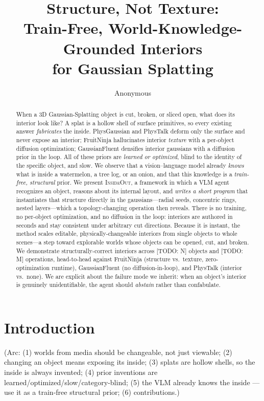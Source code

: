 \documentclass[10pt,twocolumn,letterpaper]{article}
\title{\vspace{-1em}\bfseries Structure, Not Texture:\\
Train-Free, World-Knowledge-Grounded Interiors\\ for Gaussian Splatting}
\author{Anonymous \and \todo{author list}}
\date{}
\newcommand{\sysname}{\textsc{InsideOut}} %
\newcommand{\todo}[1]{{\color{red}\small[TODO: #1]}}
\newcommand{\note}[1]{{\color{teal}\small(#1)}}
\begin{document}
\maketitle

\begin{abstract}
When a 3D Gaussian-Splatting object is cut, broken, or sliced open, what
does its interior look like? A splat is a hollow shell of surface
primitives, so every existing answer \emph{fabricates} the inside.
PhysGaussian and PhysTalk deform only the surface and never expose an
interior; FruitNinja hallucinates interior \emph{texture} with a
per-object diffusion optimization; GaussianFluent densifies interior
gaussians with a diffusion prior in the loop. All of these priors are
\emph{learned or optimized}, blind to the identity of the specific
object, and slow. We observe that a vision--language model already
\emph{knows} what is inside a watermelon, a tree log, or an onion, and
that this knowledge is a \emph{train-free, structural} prior. We present
\sysname{}, a framework in which a VLM agent recognizes an object,
reasons about its internal layout, and \emph{writes a short program}
that instantiates that structure directly in the gaussians---radial
seeds, concentric rings, nested layers---which a topology-changing
operation then reveals. There is no training, no per-object
optimization, and no diffusion in the loop: interiors are authored in
seconds and stay consistent under arbitrary cut directions. Because it
is instant, the method scales editable, physically-changeable interiors
from single objects to whole scenes---a step toward explorable worlds
whose objects can be opened, cut, and broken. We demonstrate
structurally-correct interiors across \todo{N} objects and \todo{M}
operations, head-to-head against FruitNinja (structure vs.\ texture,
zero-optimization runtime), GaussianFluent (no diffusion-in-loop), and
PhysTalk (interior vs.\ none). We are explicit about the failure mode we
inherit: when an object's interior is genuinely unidentifiable, the
agent should \emph{abstain} rather than confabulate.
\end{abstract}

\section{Introduction}
\label{sec:intro}
\note{Arc: (1) worlds from media should be changeable, not just
viewable; (2) changing an object means exposing its inside; (3) splats
are hollow shells, so the inside is always invented; (4) prior inventions
are learned/optimized/slow/category-blind; (5) the VLM already knows the
inside --- use it as a train-free structural prior; (6) contributions.}
\end{document}
